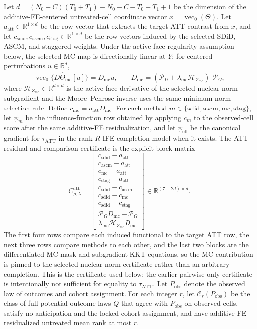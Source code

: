 \documentclass[11pt]{article}
\newcommand{\R}{\mathbb{R}}
\theoremstyle{definition}
\theoremstyle{plain}
\theoremstyle{remark}
\begin{document}
Let \(d=(N_0+C)(T_0+T_1)-N_0-C-T_0-T_1+1\) be the dimension of the additive-FE-centered untreated-cell coordinate vector \(x=\operatorname{vec}_{0}(\Theta)\).  Let \(a_{\mathrm{att}}\in\R^{1\times d}\) be the row vector that extracts the target ATT contrast from \(x\), and let \(c_{\mathrm{sdid}},c_{\mathrm{ascm}},c_{\mathrm{stag}}\in\R^{1\times d}\) be the row vectors induced by the selected SDiD, ASCM, and staggered weights.  Under the active-face regularity assumption below, the selected MC map is directionally linear at \(Y\): for centered perturbations \(u\in\R^d\),
\[
\operatorname{vec}_{0}\{D\widehat \Theta_{\mathrm{mc}}[u]\}
=D_{\mathrm{mc}}u,\qquad
D_{\mathrm{mc}}
=\left(\mathcal P_\Omega+\lambda_{\mathrm{mc}}\mathcal H_{Z_{\mathrm{mc}}}\right)^{\dagger}\mathcal P_\Omega,
\]
where \(\mathcal H_{Z_{\mathrm{mc}}}\in\R^{d\times d}\) is the active-face derivative of the selected nuclear-norm subgradient and the Moore--Penrose inverse uses the same minimum-norm selection rule.  Define \(c_{\mathrm{mc}}=a_{\mathrm{att}}D_{\mathrm{mc}}\).  For each method \(m\in\{\mathrm{sdid},\mathrm{ascm},\mathrm{mc},\mathrm{stag}\}\), let \(\psi_m\) be the influence-function row obtained by applying \(c_m\) to the observed-cell score after the same additive-FE residualization, and let \(\psi_{\mathrm{eff}}\) be the canonical gradient for \(\tau_{\mathrm{ATT}}\) in the rank-\(R\) IFE completion model when it exists.  The ATT-residual and comparison certificate is the explicit block matrix
\[
C^{\mathrm{att}}_{\rho,\lambda}
=
\begin{bmatrix}
c_{\mathrm{sdid}}-a_{\mathrm{att}}\\
c_{\mathrm{ascm}}-a_{\mathrm{att}}\\
c_{\mathrm{mc}}-a_{\mathrm{att}}\\
c_{\mathrm{stag}}-a_{\mathrm{att}}\\
c_{\mathrm{sdid}}-c_{\mathrm{ascm}}\\
c_{\mathrm{sdid}}-c_{\mathrm{mc}}\\
c_{\mathrm{sdid}}-c_{\mathrm{stag}}\\
\mathcal P_\Omega D_{\mathrm{mc}}-\mathcal P_\Omega\\
\lambda_{\mathrm{mc}}\mathcal H_{Z_{\mathrm{mc}}}D_{\mathrm{mc}}
\end{bmatrix}
\in \R^{(7+2d)\times d}.
\]
The first four rows compare each induced functional to the target ATT row, the next three rows compare methods to each other, and the last two blocks are the differentiated MC mask and subgradient KKT equations, so the MC contribution is pinned to the selected nuclear-norm certificate rather than an arbitrary completion.  This is the certificate used below; the earlier pairwise-only certificate is intentionally not sufficient for equality to \(\tau_{\mathrm{ATT}}\).  Let \(P_{\mathrm{obs}}\) denote the observed law of outcomes and cohort assignment.  For each integer \(r\), let \(\mathcal C_r(P_{\mathrm{obs}})\) be the class of full potential-outcome laws \(Q\) that agree with \(P_{\mathrm{obs}}\) on observed cells, satisfy no anticipation and the locked cohort assignment, and have additive-FE-residualized untreated mean rank at most \(r\).
\end{document}
